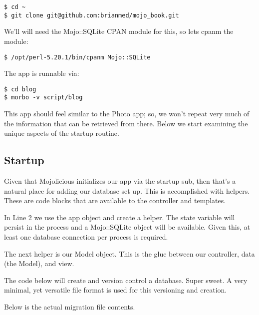 \documentclass[14pt]{extreport}
\begin{document}
\begin{lstlisting}[style=BashOutputStyle]
$ cd ~
$ git clone git@github.com:brianmed/mojo_book.git
\end{lstlisting}

We'll will need the Mojo::SQLite CPAN module for this, so lets cpanm the module:

\begin{lstlisting}[style=BashInputStyle]
$ /opt/perl-5.20.1/bin/cpanm Mojo::SQLite
\end{lstlisting}

The app is runnable via:

\begin{lstlisting}[style=BashInputStyle]
$ cd blog
$ morbo -v script/blog
\end{lstlisting}

This app should feel similar to the Photo app; so, we won't repeat very much of
the information that can be retrieved from there.  Below we start examining the
unique aspects of the startup routine.

\subsection{Startup}

Given that Mojolicious initializes our app via the startup sub, then that's a
natural place for adding our database set up.  This is accomplished with
helpers. These are code blocks that are available to the controller and
templates.



In Line 2 we use the app object and create a helper.  The state variable will
persist in the process and a Mojo::SQLite object will be available.  Given
this, at least one database connection per process is required.

The next helper is our Model object.  This is the glue between our controller,
data (the Model), and view.

The code below will create and version control a database.  Super sweet.  A
very minimal, yet versatile file format is used for this versioning and
creation.



Below is the actual migration file contents.


\end{document}
